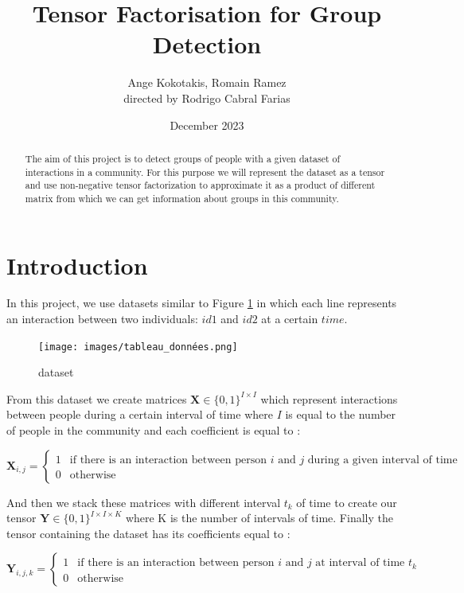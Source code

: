 \documentclass{article}
\title{Tensor Factorisation for Group Detection}
\author{ Ange Kokotakis, Romain Ramez \\ \small directed by Rodrigo Cabral Farias}
\date{December 2023}
\begin{document}
\maketitle

\begin{abstract}
    The aim of this project is to detect groups of people with a given dataset of interactions in a community.
    For this purpose we will represent the dataset as a tensor and use non-negative tensor factorization to approximate
    it as a product of different matrix from which we can get information about groups in this community.
\end{abstract}

\section{Introduction}

In this project, we use datasets similar to Figure \ref{dataset} in which each line represents an interaction between
two individuals: $id1$ and $id2$ at a certain $time$.

\begin{figure}[h]
    \centering
    \texttt{[image: images/tableau\_données.png]}
    \caption{dataset}
    \label{dataset}
\end{figure}

From this dataset we create matrices $\mathbf{X} \in \{0, 1\}^{I \times I}$ which represent interactions between people during a certain
interval of time where $I$ is equal to the number of people in the community and each coefficient is equal to :

\[
    \mathbf{X}_{i,j} = 
    \begin{cases}
        1 & \text{if there is an interaction between person $i$ and $j$ during a given interval of time} \\
        0 & \text{otherwise}
    \end{cases}
\]

And then we stack these matrices with different interval $t_k$ of time to create our tensor $\mathbf{Y} \in \{0, 1\}^{I \times I \times K}$
where K is the number of intervals of time. Finally the tensor containing the dataset has its coefficients equal to :

\[
    \mathbf{Y}_{i,j,k} = 
    \begin{cases}
        1 & \text{if there is an interaction between person $i$ and $j$ at interval of time $t_k$} \\
        0 & \text{otherwise}
    \end{cases}
\]
\end{document}
